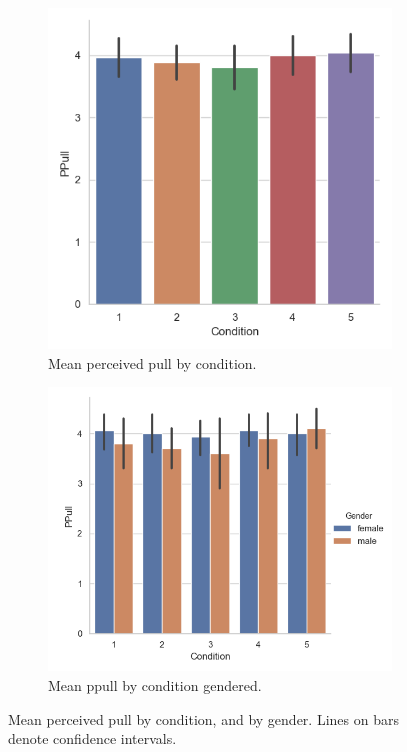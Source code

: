     
\begin{figure}[H]
 \begin{subfigure}[b]{0.5\textwidth}
     \centering
     \includegraphics[scale=0.5]{Files/Plots/ppull_by_condition_mean.png}
     \caption{Mean perceived pull by condition.}
     \label{fig:meanPPullCond}
 \end{subfigure}
  \begin{subfigure}[b]{0.5\textwidth}
     \centering
     \includegraphics[scale=0.5]{Files/Plots/ppull_by_condition_median_gen.png}
     \caption{Mean ppull by condition gendered.}
     \label{fig:fig:meanPPullGenCond}
 \end{subfigure}
     \caption{Mean perceived pull by condition, and by gender. Lines on bars denote confidence intervals.}
    \label{fig:ppullByCond}
\end{figure}

